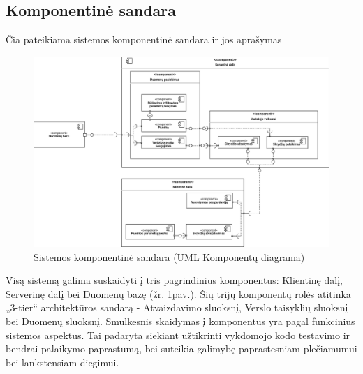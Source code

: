 \documentclass{VUMIFPSkursinis}
\begin{document}
      \subsection{Komponentinė sandara}
      Čia pateikiama sistemos komponentinė sandara ir jos aprašymas
        \begin{figure}[H]
          \centering
          \includegraphics[scale=0.45]{img/Komponentai}
          \caption{Sistemos komponentinė sandara (UML Komponentų diagrama)}
          \label{components}
        \end{figure}
        Visą sistemą galima suskaidyti į tris pagrindinius komponentus: Klientinę dalį, Serverinę dalį bei Duomenų bazę (žr. \ref{components}pav.). Šių trijų komponentų rolės atitinka „3-tier“ architektūros sandarą - Atvaizdavimo sluoksnį, Verslo taisyklių sluoksnį bei Duomenų sluoksnį. Smulkesnis skaidymas į komponentus yra pagal funkcinius sistemos aspektus. Tai padaryta siekiant užtikrinti vykdomojo kodo testavimo ir bendrai palaikymo paprastumą, bei suteikia galimybę paprastesniam plečiamumui bei lankstensiam diegimui. 
\end{document}
